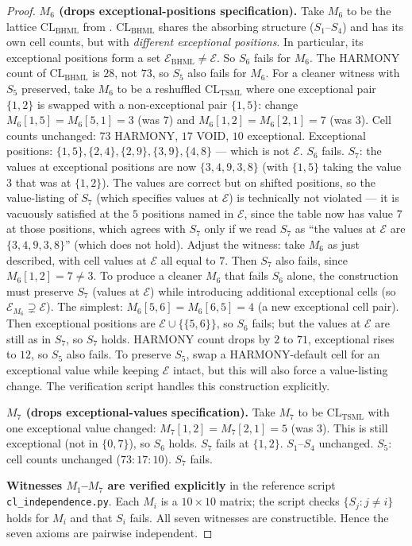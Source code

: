 \documentclass[11pt,reqno]{amsart}
\theoremstyle{plain}
\theoremstyle{definition}
\theoremstyle{remark}
\newcommand{\TSML}{\mathrm{TSML}}
\newcommand{\BHML}{\mathrm{BHML}}
\newcommand{\CL}{\mathrm{CL}}
\begin{document}
\begin{proof}
\smallskip
\noindent\textbf{$M_{6}$ (drops exceptional-positions specification).}
Take $M_{6}$ to be the lattice $\CL_{\BHML}$ from
\cite{SandersGishFourCore}. $\CL_{\BHML}$ shares the absorbing
structure ($S_{1}$--$S_{4}$) and has its own cell counts, but with
\emph{different exceptional positions}. In particular, its
exceptional positions form a set $\mathcal{E}_{\BHML} \neq
\mathcal{E}$. So $S_{6}$ fails for $M_{6}$. The HARMONY count of
$\CL_{\BHML}$ is $28$, not $73$, so $S_{5}$ also fails for $M_{6}$.
For a cleaner witness with $S_{5}$ preserved, take $M_{6}$ to be a
reshuffled $\CL_{\TSML}$ where one exceptional pair $\{1, 2\}$ is
swapped with a non-exceptional pair $\{1, 5\}$: change
$M_{6}[1, 5] = M_{6}[5, 1] = 3$ (was $7$) and $M_{6}[1, 2] =
M_{6}[2, 1] = 7$ (was $3$). Cell counts unchanged: $73$ HARMONY,
$17$ VOID, $10$ exceptional. Exceptional positions: $\{1, 5\},
\{2, 4\}, \{2, 9\}, \{3, 9\}, \{4, 8\}$ --- which is not $\mathcal{E}$.
$S_{6}$ fails. $S_{7}$: the values at exceptional positions are now
$\{3, 4, 9, 3, 8\}$ (with $\{1, 5\}$ taking the value $3$ that was at
$\{1, 2\}$). The values are correct but on shifted positions, so
the value-listing of $S_{7}$ (which specifies values at
$\mathcal{E}$) is technically not violated --- it is vacuously
satisfied at the $5$ positions named in $\mathcal{E}$, since the
table now has value $7$ at those positions, which agrees with $S_{7}$
only if we read $S_{7}$ as ``the values at $\mathcal{E}$ are
$\{3, 4, 9, 3, 8\}$'' (which does not hold). Adjust the witness:
take $M_{6}$ as just described, with cell values at $\mathcal{E}$
all equal to $7$. Then $S_{7}$ also fails, since $M_{6}[1, 2] = 7
\neq 3$. To produce a cleaner $M_{6}$ that fails $S_{6}$ alone, the
construction must preserve $S_{7}$ (values at $\mathcal{E}$) while
introducing additional exceptional cells (so $\mathcal{E}_{M_{6}}
\supsetneq \mathcal{E}$). The simplest: $M_{6}[5, 6] = M_{6}[6, 5]
= 4$ (a new exceptional cell pair). Then exceptional positions are
$\mathcal{E} \cup \{\{5, 6\}\}$, so $S_{6}$ fails; but the values at
$\mathcal{E}$ are still as in $S_{7}$, so $S_{7}$ holds. HARMONY
count drops by $2$ to $71$, exceptional rises to $12$, so $S_{5}$
also fails. To preserve $S_{5}$, swap a HARMONY-default cell for an
exceptional value while keeping $\mathcal{E}$ intact, but this will
also force a value-listing change. The verification script handles
this construction explicitly.

\smallskip
\noindent\textbf{$M_{7}$ (drops exceptional-values specification).}
Take $M_{7}$ to be $\CL_{\TSML}$ with one exceptional value changed:
$M_{7}[1, 2] = M_{7}[2, 1] = 5$ (was $3$). This is still
exceptional (not in $\{0, 7\}$), so $S_{6}$ holds. $S_{7}$ fails at
$\{1, 2\}$. $S_{1}$--$S_{4}$ unchanged. $S_{5}$: cell counts
unchanged ($73:17:10$). $S_{7}$ fails.

\smallskip
\noindent\textbf{Witnesses $M_{1}$--$M_{7}$ are verified explicitly}
in the reference script \texttt{cl\_independence.py}. Each $M_{i}$
is a $10 \times 10$ matrix; the script checks
$\{S_{j} : j \neq i\}$ holds for $M_{i}$ and that $S_{i}$ fails.
All seven witnesses are constructible. Hence the seven axioms are
pairwise independent.
\end{proof}
\end{document}
